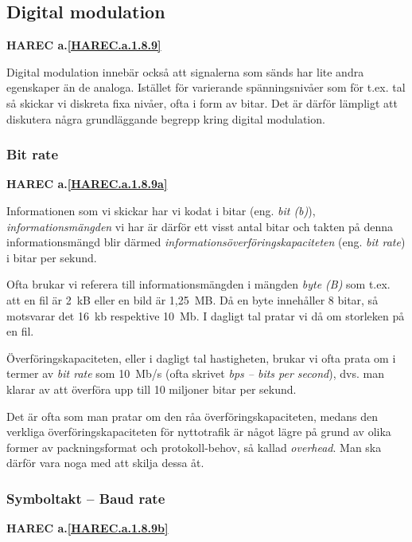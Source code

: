 \subsection{Digital modulation}
\textbf{HAREC a.\ref{HAREC.a.1.8.9}\label{myHAREC.a.1.8.9}}

Digital modulation innebär också att signalerna som sänds har lite andra
egenskaper än de analoga. Istället för varierande spänningsnivåer som för
t.ex. tal så skickar vi diskreta fixa nivåer, ofta i form av bitar. Det är
därför lämpligt att diskutera några grundläggande begrepp kring digital
modulation.

\subsubsection{Bit rate}
\textbf{HAREC a.\ref{HAREC.a.1.8.9a}\label{myHAREC.a.1.8.9a}}

Informationen som vi skickar har vi kodat i bitar (eng. \emph{bit (b)}),
\emph{informationsmängden} vi har är därför ett visst antal bitar och takten på
denna informationsmängd blir därmed \emph{informationsöverföringskapaciteten}
(eng. \emph{bit rate}) i bitar per sekund.

Ofta brukar vi referera till informationsmängden i mängden \emph{byte (B)}
som t.ex. att en fil är 2~kB eller en bild är 1,25~MB. Då en byte innehåller
8 bitar, så motsvarar det 16~kb respektive 10~Mb.
I dagligt tal pratar vi då om storleken på en fil.

Överföringskapaciteten, eller i dagligt tal hastigheten, brukar vi ofta prata
om i termer av \emph{bit rate} som 10~Mb/s (ofta skrivet \emph{bps -- bits per
second}), dvs. man klarar av att överföra upp till 10 miljoner bitar per sekund.

Det är ofta som man pratar om den råa överföringskapaciteten, medans den
verkliga överföringskapaciteten för nyttotrafik är något lägre på grund av
olika former av packningsformat och protokoll-behov, så kallad \emph{overhead}.
Man ska därför vara noga med att skilja dessa åt.

\subsubsection{Symboltakt -- Baud rate}
\textbf{HAREC a.\ref{HAREC.a.1.8.9b}\label{myHAREC.a.1.8.9b}}

